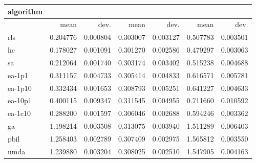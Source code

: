 \begin{tabular}{@{}l*{6}{>{{}}N{1}{2}}@{}}
\toprule
{algorithm} &  &  &  \\
\midrule
& {mean} & {dev.} & {mean} & {dev.} & {mean} & {dev.} \\
\midrule
rls & 0.204776 & 0.000804 & 0.303007 & 0.003127 & 0.507783 & 0.003501 \\
 hc & 0.178027 & 0.001091 & 0.301270 & 0.002586 & 0.479297 & 0.003063 \\
 sa & 0.212064 & 0.001740 & 0.303174 & 0.003402 & 0.515238 & 0.004688 \\
 ea-1p1 & 0.311157 & 0.004733 & 0.305414 & 0.004833 & 0.616571 & 0.005781 \\
 ea-1p10 & 0.332434 & 0.001653 & 0.308793 & 0.005251 & 0.641227 & 0.004633 \\
 ea-10p1 & 0.400115 & 0.009347 & 0.311545 & 0.004955 & 0.711660 & 0.010592 \\
 ea-1c10 & 0.288200 & 0.001597 & 0.306046 & 0.002688 & 0.594246 & 0.003362 \\
 ga & 1.198214 & 0.003508 & 0.313075 & 0.003940 & 1.511289 & 0.006403 \\
 pbil & 1.258403 & 0.002789 & 0.307409 & 0.002975 & 1.565812 & 0.003550 \\
 umda & 1.239880 & 0.003204 & 0.308025 & 0.002510 & 1.547905 & 0.004163 \\
 \bottomrule
\end{tabular}
